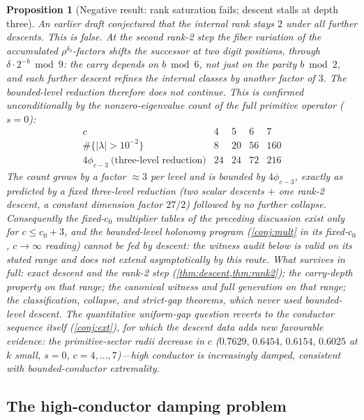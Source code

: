 \documentclass[11pt]{article}
\theoremstyle{plain}
\newtheorem{proposition}{Proposition}
\theoremstyle{definition}
\theoremstyle{remark}
\begin{document}
\begin{proposition}[Negative result: rank saturation fails; descent stalls at
depth three]\label{rem:saturation}
An earlier draft conjectured that the internal rank stays $2$ under all further
descents. \emph{This is false.} At the second rank-2 step the fiber variation
of the accumulated $\rho^{\delta_b}$-factors shifts the successor at \emph{two}
digit positions, through $\delta\cdot2^{-b}\bmod9$: the carry depends on
$b\bmod6$, not just on the parity $b\bmod2$, and each further descent refines
the internal classes by another factor of $3$. The bounded-level reduction
therefore does not continue. This is confirmed unconditionally by the
nonzero-eigenvalue count of the full primitive operator ($s=0$):
\[
\begin{array}{c|cccc}
c & 4 & 5 & 6 & 7\\\hline
\#\{|\lambda|>10^{-2}\} & 8 & 20 & 56 & 160\\
4\phi_{c-3}\ \text{(three-level reduction)} & 24 & 24 & 72 & 216
\end{array}
\]
The count grows by a factor $\approx3$ per level and is bounded by
$4\phi_{c-3}$, exactly as predicted by a \emph{fixed three-level} reduction
(two scalar descents $+$ one rank-2 descent, a constant dimension factor
$27/2$) followed by no further collapse. Consequently the fixed-$c_0$
multiplier tables of the preceding discussion exist only for $c\le c_0+3$, and
the bounded-level holonomy program (\cref{conj:mult} in its fixed-$c_0$,
$c\to\infty$ reading) cannot be fed by descent: the witness audit below is
valid on its stated range and does not extend asymptotically by this route.
What survives in full: exact descent and the rank-2 step
(\cref{thm:descent,thm:rank2}); the carry-depth property \emph{on that range};
the canonical witness and full generation on that range; the classification,
collapse, and strict-gap theorems, which never used bounded-level descent. The
quantitative uniform-gap question reverts to the conductor sequence itself
(\cref{conj:ext}), for which the descent data adds new favourable evidence: the
primitive-sector radii \emph{decrease} in $c$
($0.7629,\,0.6454,\,0.6154,\,0.6025$ at $k$ small, $s=0$, $c=4,\dots,7$)---high
conductor is increasingly damped, consistent with bounded-conductor
extremality.
\end{proposition}

\subsection*{The high-conductor damping problem}
\end{document}
